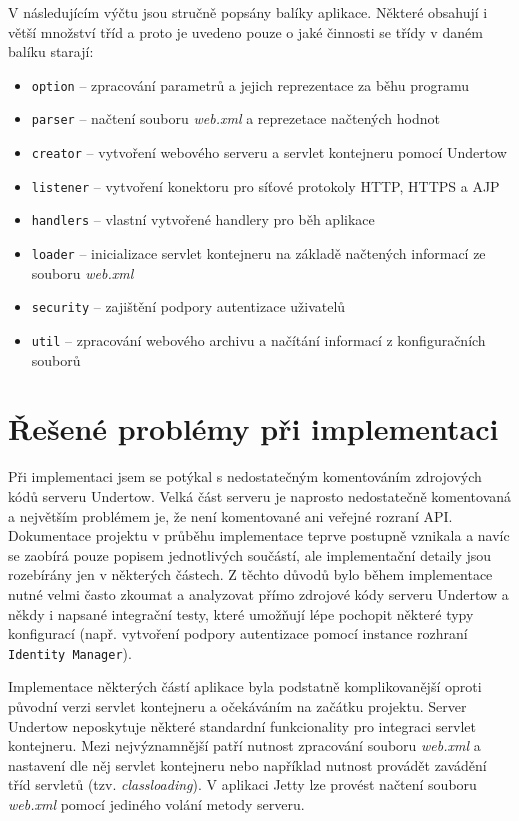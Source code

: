             V následujícím výčtu jsou stručně popsány balíky aplikace.
            Některé obsahují i větší množství tříd a proto je uvedeno pouze o jaké činnosti
            se třídy v daném balíku starají:
            \begin{itemize}
                \item \texttt{option} -- zpracování parametrů a jejich reprezentace za běhu programu
                \item \texttt{parser} -- načtení souboru \emph{web.xml} a reprezetace načtených hodnot
                \item \texttt{creator} -- vytvoření webového serveru a servlet kontejneru pomocí Undertow
                \item \texttt{listener} -- vytvoření konektoru pro síťové protokoly HTTP, HTTPS a AJP
                \item \texttt{handlers} -- vlastní vytvořené handlery pro běh aplikace
                \item \texttt{loader} -- inicializace servlet kontejneru na základě načtených informací ze souboru \emph{web.xml}
                \item \texttt{security} -- zajištění podpory autentizace uživatelů
                \item \texttt{util} -- zpracování webového archivu a načítání informací z konfiguračních souborů
            \end{itemize}




    \section{Řešené problémy při implementaci}
        Při implementaci jsem se potýkal s nedostatečným komentováním zdrojových kódů serveru Undertow.
        Velká část serveru je naprosto nedostatečně komentovaná a největším problémem je, že
        není komentované ani veřejné rozraní API. 
        Dokumentace projektu v průběhu implementace teprve postupně vznikala a navíc se zaobírá pouze popisem jednotlivých součástí,
        ale implementační detaily jsou rozebírány jen v některých částech.
        Z těchto důvodů bylo během implementace nutné velmi často zkoumat a analyzovat přímo zdrojové kódy serveru Undertow
        a někdy i napsané integrační testy, které umožňují lépe pochopit některé typy konfigurací (např. vytvoření podpory autentizace
        pomocí instance rozhraní \texttt{Identity Manager}).

        Implementace některých částí aplikace byla podstatně komplikovanější oproti původní verzi servlet kontejneru
        a očekáváním na začátku projektu. Server Undertow 
        neposkytuje některé standardní funkcionality pro integraci servlet kontejneru. Mezi nejvýznamnější patří nutnost
        zpracování souboru \emph{web.xml} a nastavení dle něj servlet kontejneru nebo například nutnost 
        provádět zavádění tříd servletů (tzv. \emph{classloading}). V aplikaci Jetty lze provést načtení 
        souboru \emph{web.xml} pomocí jediného volání metody serveru.

